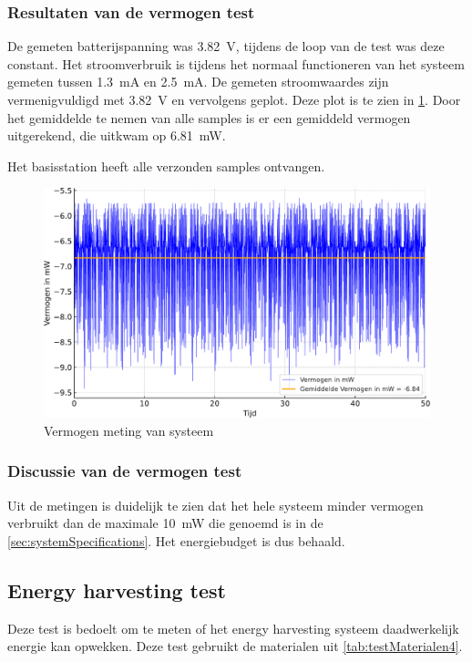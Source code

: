 \subsubsection{Resultaten van de vermogen test} \label{sec:vermogenTestResults}
De gemeten batterijspanning was \qty{3.82}{\volt}, tijdens de loop van de test was deze constant. Het stroomverbruik is tijdens het normaal functioneren van het systeem gemeten tussen \qty{1.3}{\milli\ampere} en \qty{2.5}{\milli\ampere}. De gemeten stroomwaardes zijn vermenigvuldigd met \qty{3.82}{\volt} en vervolgens geplot. Deze plot is te zien in \cref{fig:vermogenMeting}. Door het gemiddelde te nemen van alle samples is er een gemiddeld vermogen uitgerekend, die uitkwam op \qty{6.81}{\milli\watt}.

Het basisstation heeft alle verzonden samples ontvangen.


\begin{figure}[!htb]
    \centering
    \includegraphics[width=.85\textwidth]{img/vermogensMeting.pdf}
    \caption{Vermogen meting van systeem}
    \label{fig:vermogenMeting}
\end{figure}

\subsubsection{Discussie van de vermogen test}
Uit de metingen is duidelijk te zien dat het hele systeem minder vermogen verbruikt dan de maximale \qty{10}{\milli\watt} die genoemd is in de \cref{sec:systemSpecifications}. Het energiebudget is dus behaald.


\subsection{Energy harvesting test}\label{sec:harvestTest}
Deze test is bedoelt om te meten of het energy harvesting systeem daadwerkelijk energie kan opwekken. Deze test gebruikt de materialen uit \cref{tab:testMaterialen4}.

